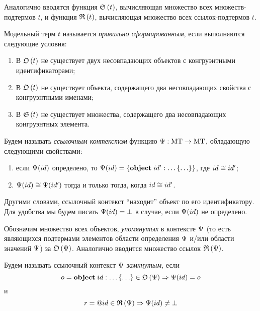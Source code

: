 Аналогично вводятся функция $\mathfrak{S}\left(t\right)$, вычисляющая множество всех множеств-подтермов $t$, и функция $\mathfrak{R}\left(t\right)$, вычисляющая множество всех ссылок-подтермов $t$.

\begin{Def}
Модельный терм $t$ называется \emph{правильно сформированным}, если выполняются следующие условия:
\begin{enumerate}
\item В $\mathfrak{O}\left(t\right)$ не существует двух несовпадающих объектов с конгруэнтными идентификаторами;
\item В $\mathfrak{O}\left(t\right)$ не существует объекта, содержащего два несовпадающих свойства с конгруэнтными именами;
\item В $\mathfrak{S}\left(t\right)$ не существует множества, содержащего два несовпадающих конгруэнтных элемента.
\end{enumerate}
\end{Def}

\begin{Def}
Будем называть \emph{ссылочным контекстом} функцию 
\mbox{$\Psi : \mbox{MT} \rightarrow \mbox{MT}$}, обладающую следующими свойствами: 
\begin{enumerate}
\item если $\Psi(id)$ определено, то $\Psi(id) = \left\{\mathbf{object}\;id' : \ldots \left\{ \ldots \right\}\right\}$, где $id \cong id'$;
\item $\Psi(id) \cong \Psi(id')$ тогда и только тогда, когда $id \cong id'$.
\end{enumerate}
\end{Def}

Другими словами, ссылочный контекст ``находит'' объект по его идентификатору. Для удобства мы будем писать $\Psi(id)=\bot$ в случае, если $\Psi(id)$ не определено.

Обозначим множество всех объектов, \emph{упомянутых} в контексте $\Psi$ (то есть являющихся подтермами элементов области определения $\Psi$ и/или области значений $\Psi$) за $\mathfrak{O}\left(\Psi\right)$. Аналогично вводится множество ссылок $\mathfrak{R}\left(\Psi\right)$.

\begin{Def}
Будем называть ссылочный контекст $\Psi$ \emph{замкнутым}, если 
$$
	o=\mathbf{object}\;id : \ldots \left\{ \ldots \right\} \in \mathfrak{O}\left(\Psi\right) \Rightarrow \Psi(id)=o
$$
и
$$
	r=@id \in \mathfrak{R}\left(\Psi\right) \Rightarrow \Psi(id) \neq \bot
$$
\end{Def}

